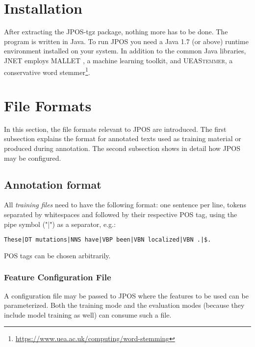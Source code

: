 \documentclass[11pt,a4paper,halfparskip]{scrartcl}
\begin{document}
\section{Installation}
After extracting the JPOS-tgz package, nothing more has to be done.
The program is written in Java. To run JPOS you need a Java 1.7 (or
above) runtime environment installed on your system. In addition to
the common Java libraries, JNET employs \textsc{MALLET}
\cite{McCallum2002}, a machine learning toolkit, and
\textsc{UEAStemmer}, a conservative word
stemmer\footnote{\url{https://www.uea.ac.uk/computing/word-stemming}}.

\section{File Formats}
\label{sec_formats}
In this section, the file formats relevant to JPOS are introduced. The
first subsection explains the format for annotated texts used as training material or produced during annotation. The second subsection shows in detail how JPOS may be configured.


\subsection{Annotation format}
\label{ssec_formatconverter}
All \textit{training files} need to have the following format: one
sentence per line, tokens separated by whitespaces and followed by their respective POS tag, using the pipe symbol ("|") as a separator, e.g.:

\begin{verbatim}
These|DT mutations|NNS have|VBP been|VBN localized|VBN .|$.
\end{verbatim}

POS tags can be chosen arbitrarily.

\subsubsection{Feature Configuration File}
\label{ssec_featconfig}

A configuration file may be passed to JPOS where the features to be
used can be parameterized. Both the training mode and the evaluation
modes (because they include model training as well) can consume such a
file.
\end{document}
